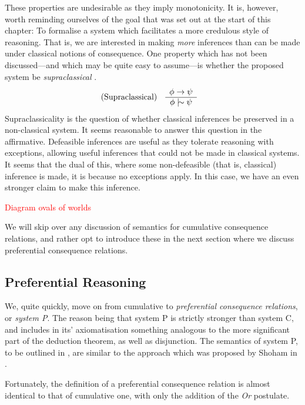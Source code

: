 These properties are undesirable as they imply monotonicity. It is, however, worth reminding ourselves of the goal that
was set out at the start of this chapter: To formalise a system which facilitates a more credulous style of reasoning.
That is, we are interested in making \textit{more} inferences than can be made under classical notions of consequence. One
property which has not been discussed---and which may be quite easy to assume---is whether the proposed system be \textit{supraclassical}
\cite{makinson2003bridges}.
%
\begin{align}
	\label{postulate:supraclassical}\inferLeft{Supraclassical}{\phi \rightarrow \psi}{\phi \twiddle \psi}
\end{align}
%
Supraclassicality is the question of whether classical inferences be preserved in a non-classical system. It seems
reasonable to answer this question in the affirmative. Defeasible inferences are useful as they tolerate reasoning with exceptions,
allowing useful inferences that could not be made in classical systems. It seems that the dual of this, where some non-defeasible
(that is, classical) inference is made, it is because no exceptions apply. In this case, we have an even stronger claim
to make this inference.

\textcolor{red}{Diagram ovals of worlds}

We will skip over any discussion of semantics for cumulative consequence relations, and rather opt to introduce these in
the next section where we discuss preferential consequence relations.

\subsection{Preferential Reasoning}
\label{subsection:system-P} 

We, quite quickly, move on from cumulative to \textit{preferential consequence relations}, or \textit{system P}. The
reason being that system P is strictly stronger than system C, and includes in its' axiomatisation something analogous
to the more significant part of the deduction theorem, as well as disjunction. The semantics of system P, to be outlined
in , are similar to the approach which was proposed by Shoham in
\cite{shohamSemanticApproach}.

Fortunately, the definition of a preferential consequence relation is almost identical to that of cumulative one, with
only the addition of the \textit{Or} postulate.

